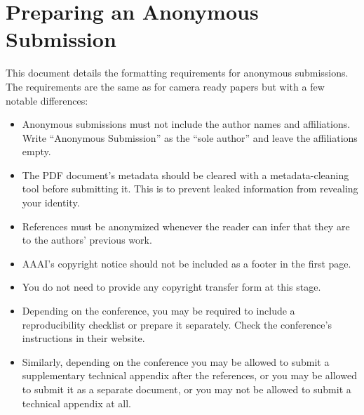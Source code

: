 
\begin{abstract}
AAAI creates proceedings, working notes, and technical reports directly from electronic source furnished by the authors. To ensure that all papers in the publication have a uniform appearance, authors must adhere to the following instructions.
\end{abstract}


\section{Preparing an Anonymous Submission}

This document details the formatting requirements for anonymous submissions. The requirements are the same as for camera ready papers but with a few notable differences:

\begin{itemize}
    \item Anonymous submissions must not include the author names and affiliations. Write ``Anonymous Submission'' as the ``sole author'' and leave the affiliations empty.
    \item The PDF document's metadata should be cleared with a metadata-cleaning tool before submitting it. This is to prevent leaked information from revealing your identity.
    \item References must be anonymized whenever the reader can infer that they are to the authors' previous work.
    \item AAAI's copyright notice should not be included as a footer in the first page.
    \item You do not need to provide any copyright transfer form at this stage.
    \item Depending on the conference, you may be required to include a reproducibility checklist or prepare it separately. Check the conference's instructions in their website.
    \item Similarly, depending on the conference you may be allowed to submit a supplementary technical appendix after the references, or you may be allowed to submit it as a separate document, or you may not be allowed to submit a technical appendix at all.
\end{itemize}

